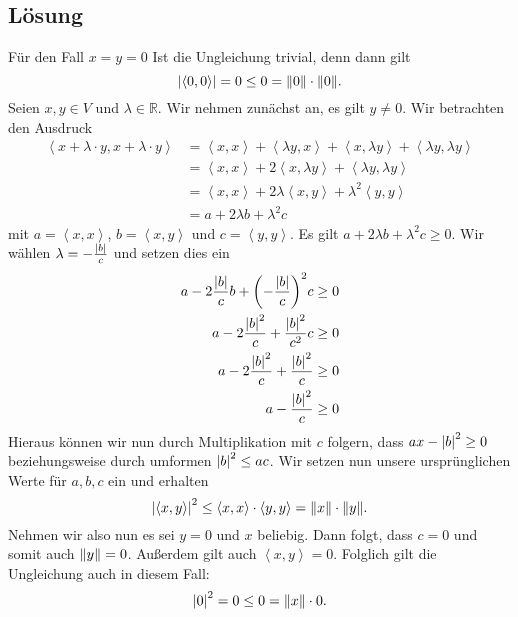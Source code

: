 \documentclass[german,12pt]{homework}
\newcommand{\RR}{\mathbb{R}}
\newcommand{\dotproduct}[2]{\left\langle#1, #2\right\rangle}
\DeclarePairedDelimiter{\absolute}{\lvert}{\rvert}
\DeclarePairedDelimiter{\norm}{\lVert}{\rVert}
\DeclarePairedDelimiter{\enbrace}{(}{)}
\begin{document}
    \subsection*{Lösung} Für den Fall \(x = y = 0\) Ist die Ungleichung
    trivial, denn dann gilt
    \[\absolute*{\dotproduct{0}{0}} = 0 \le 0 = \norm*{0} \cdot \norm*{0}.\]
    Seien \(x, y \in V\) und \(\lambda \in \RR\). Wir nehmen zunächst an, es
    gilt \(y \ne 0\). Wir betrachten den Ausdruck
    \begin{align*}
        \dotproduct{x + \lambda \cdot y}{x + \lambda \cdot y} &=
        \dotproduct{x}{x} + \dotproduct{\lambda{y}}{x} +
        \dotproduct{x}{\lambda{y}} + \dotproduct{\lambda{y}}{\lambda{y}}\\
        &= \dotproduct{x}{x} + 2\dotproduct{x}{\lambda{y}} +
        \dotproduct{\lambda{y}}{\lambda{y}}\\
        &= \dotproduct{x}{x} + 2\lambda\dotproduct{x}{y} +
        \lambda^2\dotproduct{y}{y}\\
        &= a + 2\lambda{b} + \lambda^2c
    \end{align*}
    mit \(a = \dotproduct{x}{x}\), \(b = \dotproduct{x}{y}\) und \(c =
    \dotproduct{y}{y}\). Es gilt \(a + 2\lambda{b} + \lambda^2c \ge 0\). Wir
    wählen \(\lambda = -\frac{\absolute*{b}}{c}\) und setzen dies ein
    \begin{align*}
        a - 2\frac{\absolute*{b}}{c}b + \enbrace*{-\frac{\absolute*{b}}{c}}^2c
        &\ge 0\\
        a - 2\frac{\absolute*{b}^2}{c} + \frac{\absolute*{b}^2}{c^2}c &\ge 0\\
        a - 2\frac{\absolute*{b}^2}{c} + \frac{\absolute*{b}^2}{c} &\ge 0\\
        a - \frac{\absolute*{b}^2}{c} &\ge 0
    \end{align*}
    Hieraus können wir nun durch Multiplikation mit \(c\) folgern, dass \(ax -
    \absolute*{b}^2 \ge 0\) beziehungsweise durch umformen \(\absolute*{b}^2
    \le ac\). Wir setzen nun unsere ursprünglichen Werte für \(a, b, c\) ein
    und erhalten
    \[\absolute*{\dotproduct{x}{y}}^2 \le \dotproduct{x}{x} \cdot
    \dotproduct{y}{y} = \norm*{x} \cdot \norm*{y}.\]
    Nehmen wir also nun es sei \(y = 0\) und \(x\) beliebig. Dann folgt, dass
    \(c = 0\) und somit auch \(\norm*{y} = 0\). Außerdem gilt auch
    \(\dotproduct{x}{y} = 0\). Folglich gilt die Ungleichung auch in diesem
    Fall:
    \[\absolute*{0}^2 = 0 \le 0 = \norm*{x} \cdot 0.\]
\end{document}
